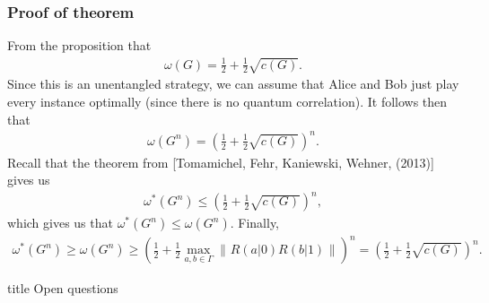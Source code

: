 \documentclass{beamer}
\newcommand{\tinyspace}{\mspace{1mu}}
\newcommand{\biggnorm}[1]{\biggl\lVert\tinyspace #1 \tinyspace\biggr\rVert}
\begin{document}
\begin{frame} 
	\frametitle{Proof of theorem}
	From the proposition that
	\begin{align*}
		\omega(G) = \frac{1}{2} + \frac{1}{2} \sqrt{c(G)}. 
	\end{align*}
	\pause
	Since this is an unentangled strategy, we can assume that Alice and Bob just play every instance optimally (since there is no quantum correlation). It follows then that
	\begin{align*}
		\omega(G^n) = \left( \frac{1}{2} + \frac{1}{2} \sqrt{c(G)} \right)^n. 
	\end{align*}
	\pause
	Recall that the theorem from [Tomamichel, Fehr, Kaniewski, Wehner, (2013)] gives us
	\begin{align*}
		\omega^*(G^n) \leq \left( \frac{1}{2} + \frac{1}{2} \sqrt{c(G)} \right)^n,
	\end{align*}
	which gives us that $\omega^*(G^n) \leq \omega(G^n)$. 
	\pause
	Finally,
	\small{
	\begin{align*}
		\omega^*(G^n) \geq \omega(G^n) \geq \left( \frac{1}{2} + \frac{1}{2} \max_{a,b \in \Gamma} \biggnorm{R(a|0)R(b|1)} \right)^n = \left( \frac{1}{2} + \frac{1}{2} \sqrt{c(G)} \right)^n.
	\end{align*}
	}
\end{frame}

\begin{frame}[noframenumbering]
  \vfill
  \centering
  \begin{beamercolorbox}[sep=8pt,center,shadow=true,rounded=true]{title}
     Open questions
  \end{beamercolorbox}
  \vfill
  \end{frame}
\end{document}
